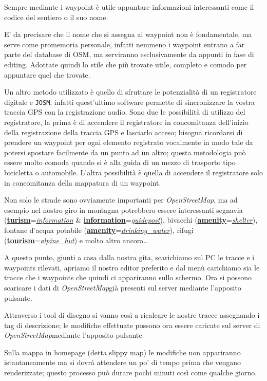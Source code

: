 \documentclass[a4paper,twoside,12pt,]{article}
\newcommand{\osm}{\emph{OpenStreetMap\xspace}}
\newcommand{\gps}{GPS\xspace}
\newcommand{\key}[1]{\underline{\textbf{#1}}}
\newcommand{\val}[1]{\underline{\textit{#1}}}
\begin{document}
Sempre mediante i waypoint è utile appuntare informazioni interessanti come il codice del sentiero o il suo nome.

E' da precisare che il nome che si assegna ai waypoint non è fondamentale, ma serve come promemoria personale, infatti nemmeno i waypoint entrano a far parte del database di OSM, ma serviranno esclusivamente da appunti in fase di editing. Adottate quindi lo stile che più trovate utile, completo e comodo per appuntare quel che trovate.

Un altro metodo utilizzato è quello di sfruttare le potenzialità di un registratore digitale e \texttt{JOSM}, infatti quest'ultimo software permette di sincronizzare la vostra traccia \gps con la registrazione audio. Sono due le possibilità di utilizzo del registratore, la prima è di accendere il registratore in concomitanza dell'inizio della registrazione della traccia \gps e lasciarlo acceso; bisogna ricordarsi di prendere un waypoint per ogni elemento registrato vocalmente in modo tale da potersi spostare facilmente da un punto ad un altro; questa metodologia può essere molto comoda quando si è alla guida di un mezzo di trasporto tipo bicicletta o automobile. L'altra possibilità è quella di accendere il registratore solo in concomitanza della mappatura di un waypoint.

Non solo le strade sono ovviamente importanti per \osm, ma ad esempio nel nostro giro in montagna potrebbero essere interessanti segnavia (\key{turism}=\val{information} \& \key{information}=\val{guidepost}), bivacchi (\key{amenity}=\val{shelter}), fontane d'acqua potabile (\key{amenity}=\val{drinking\_water}),  rifugi (\key{tourism}=\val{alpine\_hut}) e molto altro ancora\dots

A questo punto, giunti a casa dalla nostra gita, scarichiamo sul PC le tracce e i waypoints rilevati, apriamo il nostro editor preferito e dal menù carichiamo sia le tracce che i waypoints che quindi ci appariranno sullo schermo. Ora si possono scaricare i dati di \osm già presenti sul server mediante l'apposito pulsante.

Attraverso i tool di disegno si vanno così a ricalcare le nostre tracce assegnando i tag di descrizione; le modifiche effettuate possono ora essere caricate sul server di \osm mediante l'apposito pulsante.

Sulla mappa in homepage (detta slippy map) le modifiche non appariranno istantaneamente ma si dovrà attendere un po' di tempo prima che vengano renderizzate; questo processo può durare pochi minuti così come qualche giorno.
\end{document}
